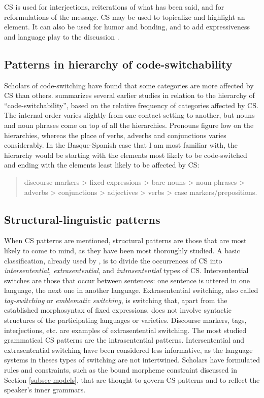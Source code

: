 \documentclass[output=paper]{langscibook}
\begin{document}
CS is used for interjections, reiterations of what has been said, and for reformulations of the message. CS may be used to topicalize and highlight an element. It can also be used for humor and bonding, and to add expressiveness and language play to the discussion \parencite[85]{gumperz1982discourse,auer1988conversation,gardner2009code}.

\subsection{Patterns in hierarchy of code-switchability} Scholars of code-switching have found that some categories are more affected by CS than others. \textcite[133]{matras2009language} summarizes several earlier studies in relation to the hierarchy of “code-switchability”, based on the relative frequency of categories affected by CS. The internal order varies slightly from one contact setting to another, but nouns and noun phrases come on top of all the hierarchies. Pronouns figure low on the hierarchies, whereas the place of verbs, adverbs and conjunctions varies considerably. In the Basque-Spanish case that I am most familiar with, the hierarchy would be starting with the elements most likely to be code-switched and ending with the elements least likely to be affected by CS:

\begin{quote}
discourse markers > fixed expressions > bare nouns > noun phrases > \mbox{adverbs} > conjunctions > adjectives > verbs > case markers/prepositions.
\end{quote}

\subsection{Structural-linguistic patterns}
When CS patterns are mentioned, structural patterns are those that are most likely to come to mind, as they have been most thoroughly studied. A basic classification, already used by \textcite{poplack1980sometimes}, is to divide the occurrences of CS into \textit{intersentential, extrasentential}, and \textit{intrasentential} types of CS. Intersentential switches are those that occur between sentences: one sentence is uttered in one language, the next one in another language. Extrasentential switching, also called \textit{tag-switching} or \textit{emblematic switching}, is switching that, apart from the established morphosyntax of fixed expressions, does not involve syntactic structures of the participating languages or varieties. Discourse markers, tags, interjections, etc. are examples of extrasentential switching. The most studied grammatical CS patterns are the intrasentential patterns. Intersentential and extrasentential switching have been considered less informative, as the language systems in theses types of switching are not intertwined. Scholars have formulated rules and constraints, such as the bound morpheme constraint discussed in Section \ref{subsec-models}, that are thought to govern CS patterns and to reflect the speaker's inner grammars. 
\end{document}
